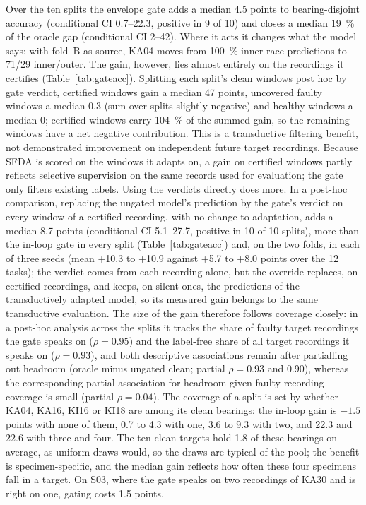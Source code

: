 Over the ten splits the envelope gate adds a median 4.5 points to bearing-disjoint
accuracy (conditional CI 0.7--22.3, positive in 9 of 10) and closes a median \SI{19}{\percent} of the
oracle gap (conditional CI 2--42). Where it acts it changes what the model says: with fold~B as source, KA04 moves from
\SI{100}{\percent} inner-race predictions to 71/29 inner/outer. The gain, however, lies almost entirely on the recordings it
certifies (Table~\ref{tab:gateacc}). Splitting each split's clean windows post hoc by gate verdict, certified windows gain a median 47 points, uncovered faulty
windows a median 0.3 (sum over splits slightly negative) and healthy windows a median 0; certified windows carry
\SI{104}{\percent} of the summed gain, so the remaining windows have a net negative contribution. This is a transductive filtering benefit, not demonstrated improvement on independent future target recordings. Because SFDA is scored on the windows it adapts on, a gain on certified windows partly reflects selective supervision on the same records used for evaluation; the gate only filters existing labels. Using the verdicts directly does more. In a post-hoc comparison, replacing the ungated model's prediction by the gate's verdict on every window of a certified recording, with no change to adaptation, adds a median 8.7 points (conditional CI 5.1--27.7, positive in 10 of 10 splits), more than the in-loop gate in every split (Table~\ref{tab:gateacc}) and, on the two folds, in each of three seeds (mean +10.3 to +10.9 against +5.7 to +8.0 points over the 12 tasks); the verdict comes from each recording alone, but the override replaces, on certified recordings, and keeps, on silent ones, the predictions of the transductively adapted model, so its measured gain belongs to the same transductive evaluation. The size of the gain therefore follows coverage closely: in a post-hoc analysis across the splits it tracks
the share of faulty target recordings the gate speaks on ($\rho = 0.95$) and the label-free share of all target recordings
it speaks on ($\rho = 0.93$), and both descriptive associations remain after partialling out headroom (oracle minus ungated clean;
partial $\rho = 0.93$ and 0.90), whereas the corresponding partial association for headroom given faulty-recording coverage is small (partial $\rho = 0.04$). The
coverage of a split is set by whether KA04, KA16, KI16 or KI18 are among its clean bearings: the in-loop gain is
$-1.5$ points with none of them, 0.7 to 4.3 with one, 3.6 to 9.3 with two, and 22.3 and 22.6 with three and four. The
ten clean targets hold 1.8 of these bearings on average, as uniform draws would, so the draws are typical of the pool; the benefit is specimen-specific,
and the median gain reflects how often these four specimens fall in a target. On S03, where the gate speaks
on two recordings of KA30 and is right on one, gating costs 1.5 points.

